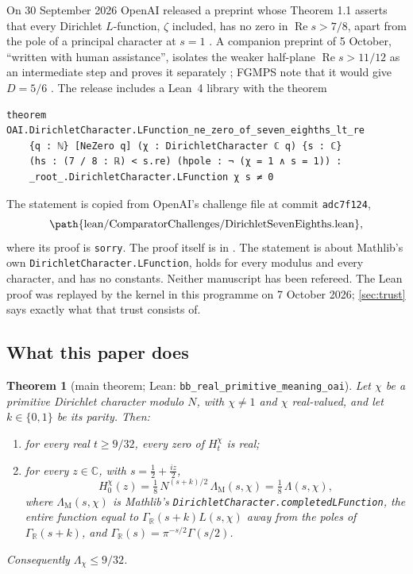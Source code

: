 \documentclass[11pt]{article}
\newtheorem{theorem}{Theorem}[section]
\theoremstyle{definition}
\newcommand{\lean}[1]{\texttt{#1}}
\newcommand{\re}{\operatorname{Re}}
\newcommand{\C}{\mathbb{C}}
\newcommand{\GR}{\Gamma_{\mathbb{R}}}
\newcommand{\Lc}{\Lambda}
\begin{document}
On 30 September 2026 OpenAI released a preprint whose Theorem 1.1 asserts that every Dirichlet $L$-function, $\zeta$ included, has no zero in $\re s > 7/8$, apart from the pole of a principal character at $s = 1$ \cite{OAI7over8}. A companion preprint of 5 October, ``written with human assistance'', isolates the weaker half-plane $\re s > 11/12$ as an intermediate step and proves it separately \cite{OAIqrh}; FGMPS note that it would give $D = 5/6$ \cite[Remark~3.1]{FGMPS2026}. The release includes a Lean~4 library \cite{OAIlean} with the theorem
\begin{lstlisting}
theorem OAI.DirichletCharacter.LFunction_ne_zero_of_seven_eighths_lt_re
    {q : ℕ} [NeZero q] (χ : DirichletCharacter ℂ q) {s : ℂ}
    (hs : (7 / 8 : ℝ) < s.re) (hpole : ¬ (χ = 1 ∧ s = 1)) :
    _root_.DirichletCharacter.LFunction χ s ≠ 0
\end{lstlisting}
\noindent
The statement is copied from OpenAI's challenge file at commit \lean{adc7f124},
\[\text{\path{lean/ComparatorChallenges/DirichletSevenEighths.lean}},\]
where its proof is \lean{sorry}. The proof itself is in \allowbreak{}. The statement is about Mathlib's own \lean{DirichletCharacter.\allowbreak{}LFunction}, holds for every modulus and every character, and has no constants. Neither manuscript has been refereed. The Lean proof was replayed by the kernel in this programme on 7 October 2026; \cref{sec:trust} says exactly what that trust consists of.

\subsection{What this paper does}

\begin{theorem}[main theorem; Lean: \lean{bb\_\allowbreak{}real\_\allowbreak{}primitive\_\allowbreak{}meaning\_\allowbreak{}oai}]\label{thm:main}
Let $\chi$ be a primitive Dirichlet character modulo $N$, with $\chi \ne 1$ and $\chi$ real-valued, and let $k \in \{0,1\}$ be its parity. Then:
\begin{enumerate}[label=(\alph*)]
\item for every real $t \ge 9/32$, every zero of $H^\chi_t$ is real;
\item for every $z \in \C$, with $s = \tfrac12 + \tfrac{iz}{2}$,
\[
H^\chi_0(z) = \tfrac18\, N^{(s+k)/2}\,\Lc_{\mathrm{M}}(s,\chi) = \tfrac18\,\Lc(s,\chi),
\]
where $\Lc_{\mathrm{M}}(s,\chi)$ is Mathlib's \lean{DirichletCharacter.\allowbreak{}completedLFunction}, the entire function equal to $\GR(s+k)L(s,\chi)$ away from the poles of $\GR(s+k)$, and $\GR(s) = \pi^{-s/2}\Gamma(s/2)$.
\end{enumerate}
Consequently $\Lc_\chi \le 9/32$.
\end{theorem}
\end{document}
